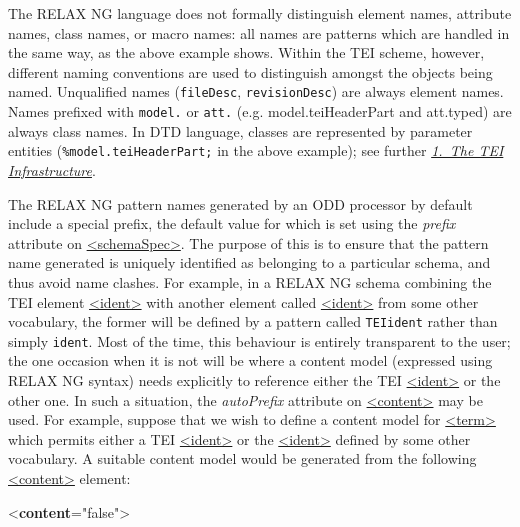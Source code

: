 The RELAX NG language does not formally distinguish element names, attribute names, class names, or macro names: all names are patterns which are handled in the same way, as the above example shows. Within the TEI scheme, however, different naming conventions are used to distinguish amongst the objects being named. Unqualified names (\texttt{fileDesc}, \texttt{revisionDesc}) are always element names. Names prefixed with \texttt{model.} or \texttt{att.} (e.g. \textsf{model.teiHeaderPart} and \textsf{att.typed}) are always class names. In DTD language, classes are represented by parameter entities (\texttt{\%model.teiHeaderPart;} in the above example); see further \textit{\hyperref[ST]{1.\ The TEI Infrastructure}}.\par
The RELAX NG pattern names generated by an ODD processor by default include a special prefix, the default value for which is set using the {\itshape prefix} attribute on \hyperref[TEI.schemaSpec]{<schemaSpec>}.  The purpose of this is to ensure that the pattern name generated is uniquely identified as belonging to a particular schema, and thus avoid name clashes. For example, in a RELAX NG schema combining the TEI element \hyperref[TEI.ident]{<ident>} with another element called \hyperref[TEI.ident]{<ident>} from some other vocabulary, the former will be defined by a pattern called \texttt{TEI\textunderscore ident} rather than simply \texttt{ident}. Most of the time, this behaviour is entirely transparent to the user; the one occasion when it is not will be where a content model (expressed using RELAX NG syntax) needs explicitly to reference either the TEI \hyperref[TEI.ident]{<ident>} or the other one. In such a situation, the {\itshape autoPrefix} attribute on \hyperref[TEI.content]{<content>} may be used. For example, suppose that we wish to define a content model for \hyperref[TEI.term]{<term>} which permits either a TEI \hyperref[TEI.ident]{<ident>} or the \hyperref[TEI.ident]{<ident>} defined by some other vocabulary. A suitable content model would be generated from the following \hyperref[TEI.content]{<content>} element: \par\bgroup{}\exampleFont \begin{shaded}\noindent\mbox{}{<\textbf{content}\hspace*{1em}{autoPrefix}="{false}">}\mbox{}\newline 
{}\mbox{}\newline 

\end{shaded}
